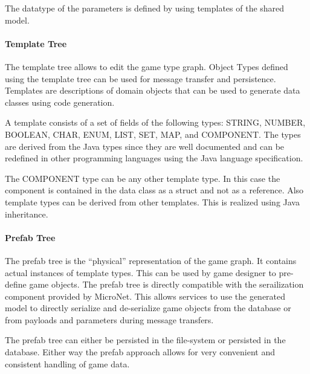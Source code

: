 The datatype of the parameters is defined by using templates of the shared
model.

\paragraph{Template Tree}

The template tree allows to edit the game type graph. Object Types defined using
the template tree can be used for message transfer and persistence. Templates
are descriptions of domain objects that can be used to generate data classes
using code generation.

A template consists of a set of fields of the following types: STRING, NUMBER,
BOOLEAN, CHAR, ENUM, LIST, SET, MAP, and COMPONENT. The types are derived from
the Java types since they are well documented and can be redefined in other
programming languages using the Java language specification.

The COMPONENT type can be any other template type. In this case the component is
contained in the data class as a struct and not as a reference. Also template
types can be derived from other templates. This is realized using Java
inheritance.

\paragraph{Prefab Tree}

The prefab tree is the ``physical'' representation of the game graph. It
contains actual instances of template types. This can be used by game designer
to pre-define game objects. The prefab tree is directly compatible with the
serailization component provided by MicroNet. This allows services to use the
generated model to directly serialize and de-serialize game objects from the
database or from payloads and parameters during message transfers.

The prefab tree can either be persisted in the file-system or persisted in the
database. Either way the prefab approach allows for very convenient and
consistent handling of game data.

